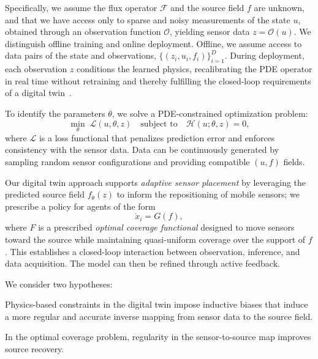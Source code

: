 \documentclass[onefignum,onetabnum]{siamart171218} %
\begin{document}
Specifically, we assume the flux operator $\mathcal{F}$ and the source field $f$ are unknown, and that we have access only to sparse and noisy measurements of the state $u$, obtained through an observation function $\mathcal{O}$, yielding sensor data $z = \mathcal{O}(u)$. We distinguish offline training and online deployment. Offline, we assume access to data pairs of the state and observations, $\{(z_i,u_i,f_i)\}_{i=1}^D$. During deployment, each observation $z$ conditions the learned physics, recalibrating the PDE operator in real time without retraining and thereby fulfilling the closed-loop requirements of a digital twin~\cite{willcox2023foundational}.


To identify the parameters $\theta$, we solve a PDE-constrained optimization problem:
\begin{equation}
    \min_\theta \; \mathcal{L}(u,\theta, z) \quad \text{subject to} \quad \mathcal{H}(u; \theta, z) = 0,
\end{equation}
where $\mathcal{L}$ is a loss functional that penalizes prediction error and enforces consistency with the sensor data. Data can be continuously generated by sampling random sensor configurations and providing compatible $(u,f)$ fields.

Our digital twin approach supports \emph{adaptive sensor placement} by leveraging the predicted source field $f_\theta(z)$ to inform the repositioning of mobile sensors; we prescribe a policy for agents of the form
\begin{equation}
    \dot{x}_i = G(f),
\end{equation}
where $F$ is a prescribed \textit{optimal coverage functional} designed to move sensors toward the source while maintaining quasi-uniform coverage over the support of $f$. This establishes a closed-loop interaction between observation, inference, and data acquisition. The model can then be refined through active feedback. 

We consider two hypotheses:
\begin{hypobox}
\begin{Henum}
    \item \label{hyp:H1} Physics-based constraints in the digital twin impose inductive biases that induce a more regular and accurate inverse mapping from sensor data to the source field.
    \item \label{hyp:H2} In the optimal coverage problem, regularity in the sensor-to-source map improves source recovery.
\end{Henum}
\end{hypobox}
\end{document}
